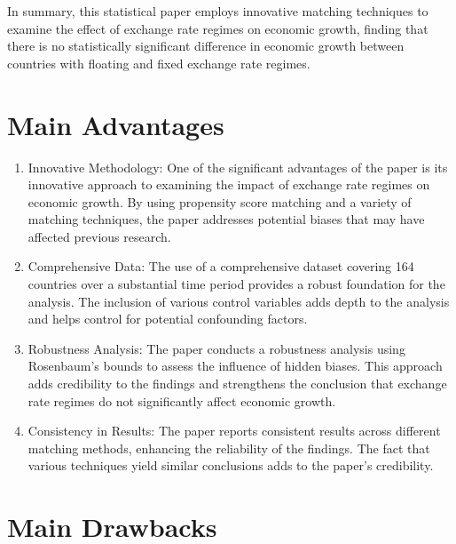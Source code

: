 \documentclass[
  12pt]{article}
\begin{document}
In summary, this statistical paper employs innovative matching
techniques to examine the effect of exchange rate regimes on economic
growth, finding that there is no statistically significant difference in
economic growth between countries with floating and fixed exchange rate
regimes.

\hypertarget{main-advantages}{%
\section{Main Advantages}\label{main-advantages}}

\begin{enumerate}
\def\labelenumi{\arabic{enumi}.}
\item
  Innovative Methodology: One of the significant advantages of the paper
  is its innovative approach to examining the impact of exchange rate
  regimes on economic growth. By using propensity score matching and a
  variety of matching techniques, the paper addresses potential biases
  that may have affected previous research.
\item
  Comprehensive Data: The use of a comprehensive dataset covering 164
  countries over a substantial time period provides a robust foundation
  for the analysis. The inclusion of various control variables adds
  depth to the analysis and helps control for potential confounding
  factors.
\item
  Robustness Analysis: The paper conducts a robustness analysis using
  Rosenbaum's bounds to assess the influence of hidden biases. This
  approach adds credibility to the findings and strengthens the
  conclusion that exchange rate regimes do not significantly affect
  economic growth.
\item
  Consistency in Results: The paper reports consistent results across
  different matching methods, enhancing the reliability of the findings.
  The fact that various techniques yield similar conclusions adds to the
  paper's credibility.
\end{enumerate}

\hypertarget{main-drawbacks}{%
\section{Main Drawbacks}\label{main-drawbacks}}
\end{document}
